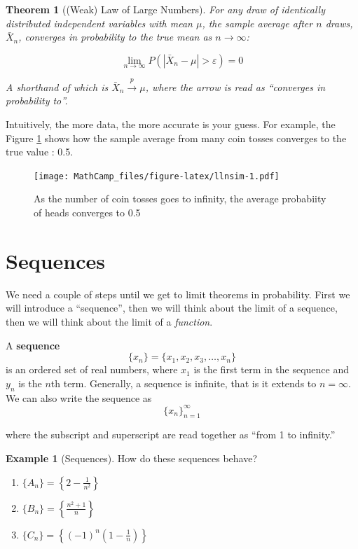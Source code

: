 \documentclass[
]{book}
\providecommand{\tightlist}{%
  \setlength{\itemsep}{0pt}\setlength{\parskip}{0pt}}
\newtheorem{theorem}{Theorem}[chapter]
\theoremstyle{definition}
\theoremstyle{definition}
\newtheorem{example}{Example}[chapter]
\theoremstyle{definition}
\theoremstyle{definition}
\theoremstyle{remark}
\begin{document}
\begin{theorem}[(Weak) Law of Large Numbers]
\protect\hypertarget{thm:lln-lim}{}{\label{thm:lln-lim} {} }For any draw of identically distributed independent variables with mean \(\mu\), the sample average after \(n\) draws, \(\bar{X}_n\), converges in probability to the true mean as \(n \rightarrow \infty\):

\[\lim\limits_{n\to \infty} P(|\bar{X}_n - \mu | > \varepsilon) = 0\]

A shorthand of which is \(\bar{X}_n \xrightarrow{p} \mu\), where the arrow is read as ``converges in probability to''.
\end{theorem}

Intuitively, the more data, the more accurate is your guess. For example, the Figure \ref{fig:llnsim} shows how the sample average from many coin tosses converges to the true value : 0.5.

\begin{figure}
\centering
\texttt{[image: MathCamp\_files/figure-latex/llnsim-1.pdf]}
\caption{\label{fig:llnsim}As the number of coin tosses goes to infinity, the average probabiity of heads converges to 0.5}
\end{figure}

\hypertarget{sequences}{%
\section{Sequences}\label{sequences}}

We need a couple of steps until we get to limit theorems in probability. First we will introduce a ``sequence'', then we will think about the limit of a sequence, then we will think about the limit of a \emph{function}.

A \textbf{sequence} \[\{x_n\}=\{x_1, x_2, x_3, \ldots, x_n\}\] is an ordered set of real numbers, where \(x_1\) is the first term in the sequence and \(y_n\) is the \(n\)th term. Generally, a sequence is infinite, that is it extends to \(n=\infty\). We can also write the sequence as \[\{x_n\}^\infty_{n=1}\]

where the subscript and superscript are read together as ``from 1 to infinity.''

\begin{example}[Sequences]
\protect\hypertarget{exm:seqbehav}{}{\label{exm:seqbehav} {} }
How do these sequences behave?

\begin{enumerate}
\def\labelenumi{\arabic{enumi}.}
\tightlist
\item
  \(\{A_n\}=\left\{ 2-\frac{1}{n^2} \right\}\)
\item
  \(\{B_n\}=\left\{\frac{n^2+1}{n} \right\}\)
\item
  \(\{C_n\}=\left\{(-1)^n \left(1-\frac{1}{n}\right) \right\}\)
\end{enumerate}
\end{example}
\end{document}
